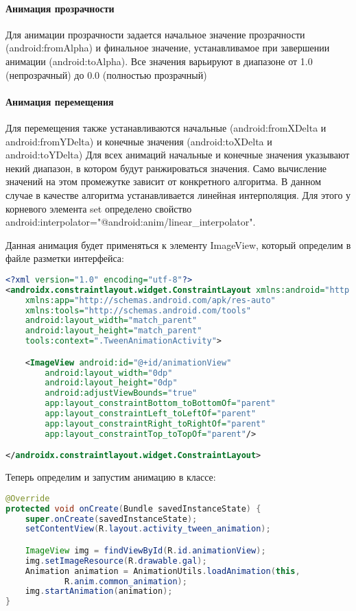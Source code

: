 \paragraph{Анимация прозрачности}
Для анимации прозрачности задается начальное значение прозрачности
(android:fromAlpha) и финальное значение, устанавливамое при завершении
анимации (android:toAlpha). Все значения варьируют в диапазоне от 1.0
(непрозрачный) до 0.0 (полностью прозрачный)

\paragraph{Анимация перемещения}
Для перемещения также устанавливаются начальные (android:fromXDelta и
android:fromYDelta) и конечные значения (android:toXDelta и
android:toYDelta)
Для всех анимаций начальные и конечные значения указывают некий
диапазон, в котором будут ранжироваться значения. Само вычисление
значений на этом промежутке зависит от конкретного алгоритма. В данном
случае в качестве алгоритма устанавливается линейная интерполяция. Для
этого у корневого элемента set определено свойство
android:interpolator="@android:anim/linear\_interpolator".

Данная анимация будет применяться к элементу ImageView, который
определим в файле разметки интерфейса:

\begin{lstlisting}[language=XML
	, label=lst:
	]
<?xml version="1.0" encoding="utf-8"?>
<androidx.constraintlayout.widget.ConstraintLayout xmlns:android="http://schemas.android.com/apk/res/android"
    xmlns:app="http://schemas.android.com/apk/res-auto"
    xmlns:tools="http://schemas.android.com/tools"
    android:layout_width="match_parent"
    android:layout_height="match_parent"
    tools:context=".TweenAnimationActivity">

    <ImageView android:id="@+id/animationView"
        android:layout_width="0dp"
        android:layout_height="0dp"
        android:adjustViewBounds="true"
        app:layout_constraintBottom_toBottomOf="parent"
        app:layout_constraintLeft_toLeftOf="parent"
        app:layout_constraintRight_toRightOf="parent"
        app:layout_constraintTop_toTopOf="parent"/>

</androidx.constraintlayout.widget.ConstraintLayout>
\end{lstlisting}

Теперь определим и запустим анимацию в классе:

\begin{lstlisting}[language=Java
	, label=lst:
	]
@Override
protected void onCreate(Bundle savedInstanceState) {
	super.onCreate(savedInstanceState);
	setContentView(R.layout.activity_tween_animation);

	ImageView img = findViewById(R.id.animationView);
	img.setImageResource(R.drawable.gal);
	Animation animation = AnimationUtils.loadAnimation(this,
			R.anim.common_animation);
	img.startAnimation(animation);
}
\end{lstlisting}

